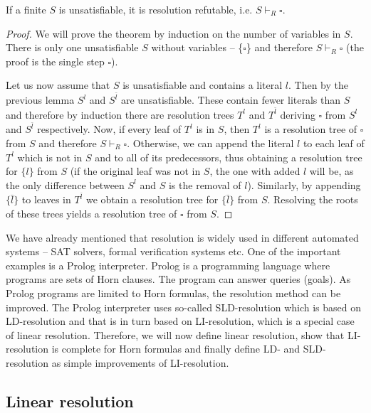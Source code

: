 \begin{theorem}
If a finite $S$ is unsatisfiable, it is resolution refutable, i.e. $S \vdash_R \square$.
\end{theorem}
\begin{proof}
We will prove the theorem by induction on the number of variables in $S$. There is only one unsatisfiable $S$ without variables -- \{$\square$\} and therefore $S \vdash_R \square$ (the proof is the single step $\square$).

Let us now assume that $S$ is unsatisfiable and contains a literal $l$. Then by the previous lemma $S^l$ and $S^{\bar{l}}$ are unsatisfiable. These contain fewer literals than $S$ and therefore by induction there are resolution trees $T^l$ and $T^{\bar{l}}$ deriving $\square$ from $S^l$ and $S^{\bar{l}}$ respectively. Now, if every leaf of $T^l$ is in $S$, then $T^l$ is a resolution tree of $\square$ from $S$ and therefore $S \vdash_R \square$. Otherwise, we can append the literal $l$ to each leaf of $T^l$ which is not in $S$ and to all of its predecessors, thus obtaining a resolution tree for $\{l\}$ from $S$ (if the original leaf was not in $S$, the one with added $l$ will be, as the only difference between $S^l$ and $S$ is the removal of $l$). Similarly, by appending $\{\bar{l}\}$ to leaves in $T^{\bar{l}}$ we obtain a resolution tree for $\{\bar{l}\}$ from $S$. Resolving the roots of these trees yields a resolution tree of $\square$ from $S$.
\end{proof}

We have already mentioned that resolution is widely used in different automated systems -- SAT solvers, formal verification systems etc. One of the important examples is a Prolog interpreter. Prolog is a programming language where programs are sets of Horn clauses. The program can answer queries (goals). As Prolog programs are limited to Horn formulas, the resolution method can be improved. The Prolog interpreter uses so-called SLD-resolution which is based on LD-resolution and that is in turn based on LI-resolution, which is a special case of linear resolution. Therefore, we will now define linear resolution, show that LI-resolution is complete for Horn formulas and finally define LD- and SLD-resolution as simple improvements of LI-resolution.

\subsection{Linear resolution}

